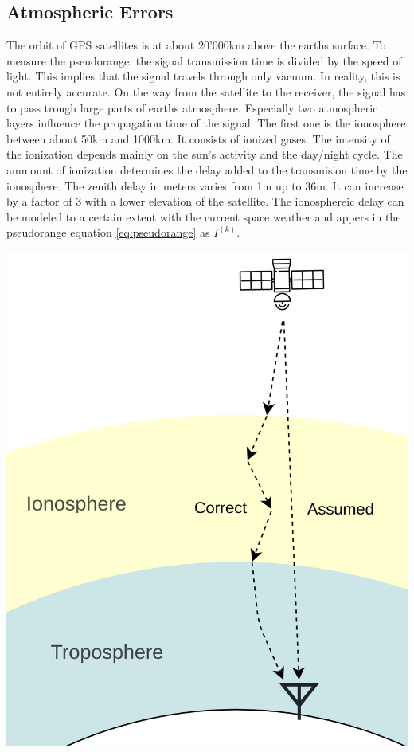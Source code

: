 \subsection{Atmospheric Errors}

\begin{minipage}{0.6\textwidth}
  The orbit of GPS satellites is at about 20'000km above the earths surface.
  To measure the pseudorange, the signal transmission time is divided by the speed of light.
  This implies that the signal travels through only vacuum.
  In reality, this is not entirely accurate.
  On the way from the satellite to the receiver, the signal has to pass trough large parts of earths atmosphere.
  Especially two atmospheric layers influence the propagation time of the signal.
  The first one is the ionosphere between about 50km and 1000km.
  It consists of ionized gases.
  The intensity of the ionization depends mainly on the sun's activity and the day/night cycle.
  The ammount of ionization determines the delay added to the transmision time by the ionosphere.
  The zenith delay in meters varies from 1m up to 36m. 
  It can increase by a factor of 3 with a lower elevation of the satellite.
  The ionosphereic delay can be modeled to a certain extent with the current space weather and appers in the pseudorange equation \ref{eq:pseudorange} as $I^{(k)}$.
\end{minipage}
\hfill
\begin{minipage}{0.38\textwidth}
 \includegraphics[width=\textwidth]{images/Atmospheric_Errors.png}
\end{minipage}

